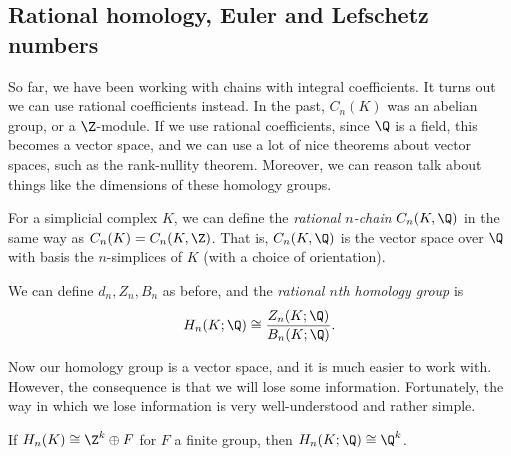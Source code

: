 \documentclass[a4paper]{article}
\begin{document}
\subsection{Rational homology, Euler and Lefschetz numbers}
So far, we have been working with chains with integral coefficients. It turns out we can use rational coefficients instead. In the past, $C_n(K)$ was an abelian group, or a $\Z$-module. If we use rational coefficients, since $\Q$ is a field, this becomes a vector space, and we can use a lot of nice theorems about vector spaces, such as the rank-nullity theorem. Moreover, we can reason talk about things like the dimensions of these homology groups.

\begin{defi}
  For a simplicial complex $K$, we can define the \emph{rational $n$-chain} $C_n(K, \Q)$ in the same way as $C_n(K) = C_n(K, \Z)$. That is, $C_n(K, \Q)$ is the vector space over $\Q$ with basis the $n$-simplices of $K$ (with a choice of orientation).

  We can define $d_n, Z_n, B_n$ as before, and the \emph{rational $n$th homology group} is
  \[
    H_n(K; \Q) \cong \frac{Z_n(K; \Q)}{B_n(K; \Q)}.
  \]
\end{defi}
Now our homology group is a vector space, and it is much easier to work with. However, the consequence is that we will lose some information. Fortunately, the way in which we lose information is very well-understood and rather simple.

\begin{lemma}
  If $H_n(K) \cong \Z^k \oplus F$ for $F$ a finite group, then $H_n(K; \Q) \cong \Q^k$.
\end{lemma}
\end{document}
